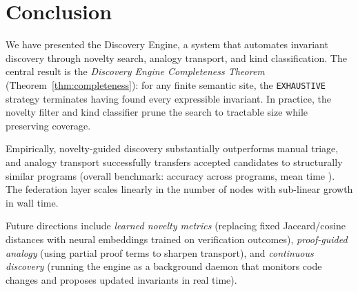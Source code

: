 \documentclass[11pt]{article}
\newcommand{\alg}[1]{\texttt{\small #1}}   %
\begin{document}
\section{Conclusion}\label{sec:conclusion}

We have presented the \JuGeo{} Discovery Engine, a system that
automates invariant discovery through novelty search, analogy
transport, and kind classification.  The central result is the
\emph{Discovery Engine Completeness Theorem}
(Theorem~\ref{thm:completeness}): for any finite semantic site, the
\alg{EXHAUSTIVE} strategy terminates having found every expressible
invariant.  In practice, the novelty filter and kind classifier prune
the search to tractable size while preserving coverage.

Empirically, novelty-guided discovery substantially outperforms manual triage,
and analogy transport successfully transfers accepted candidates to
structurally similar programs (overall benchmark: \expAccuracy{} accuracy
across \expTotalPrograms{} programs, mean time \expTimeMean).
The federation layer scales linearly in the number of nodes with
sub-linear growth in wall time.

Future directions include \emph{learned novelty metrics} (replacing
fixed Jaccard/cosine distances with neural embeddings trained on
verification outcomes), \emph{proof-guided analogy} (using partial
proof terms to sharpen transport), and \emph{continuous discovery}
(running the engine as a background daemon that monitors code changes
and proposes updated invariants in real time).
\end{document}
